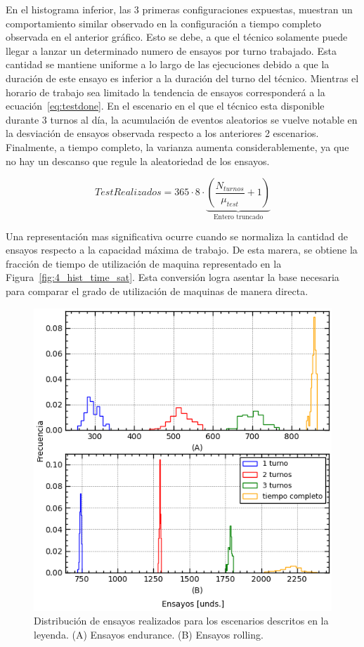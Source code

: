 En el histograma inferior,
las 3 primeras configuraciones expuestas,
muestran un comportamiento similar observado en
la configuración a tiempo completo observada en el anterior gráfico.
Esto se debe, a que el técnico solamente puede llegar a lanzar
un determinado numero de ensayos por turno trabajado.
Esta cantidad se mantiene uniforme a lo largo de las ejecuciones
debido a que la duración de este ensayo es inferior
a la duración del turno del técnico.
Mientras el horario de trabajo sea limitado
la tendencia de ensayos corresponderá a la ecuación~\ref{eq:testdone}.
En el escenario en el que el técnico esta disponible durante 3 turnos al día,
la acumulación de eventos aleatorios se vuelve notable
en la desviación de ensayos observada respecto a los anteriores 2 escenarios.
Finalmente, a tiempo completo, la varianza aumenta considerablemente, 
ya que no hay un descanso que regule la aleatoriedad de los ensayos.

\begin{equation}
	Test Realizados = 365 \cdot 8 \cdot 
	\underbrace{
		\left(\frac{N_{turnos}}{\mu_{test}} + 1\right)
	}_{\text{Entero truncado}}
	\label{eq:testdone}
\end{equation}

Una representación mas significativa ocurre
cuando se normaliza la cantidad de ensayos respecto
a la capacidad máxima de trabajo.
De esta marera, se obtiene la fracción de tiempo de utilización de maquina
representado en la Figura~\ref{fig:4_hist_time_sat}.
Esta conversión logra asentar la base necesaria para
comparar el grado de utilización de maquinas de manera directa.

\begin{figure}
	\begin{center}
		\includegraphics{fig/4_hist_tests_done}
	\end{center}
	\caption{Distribución de ensayos realizados para los escenarios descritos en la leyenda.
	(A) Ensayos endurance. (B) Ensayos rolling.}
	\label{fig:4_hist_tests_done}
\end{figure}

